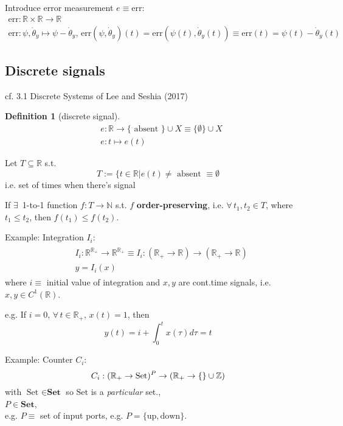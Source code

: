 \documentclass[10pt]{amsart}
\newtheorem{definition}{Definition}
\begin{document}
\begin{multicols*}{2}
Introduce error measurement $e\equiv \text{err}$:
\[
\begin{gathered}
	\text{err}:\mathbb{R} \times \mathbb{R} \to \mathbb{R} \\ 
\text{err}:\psi,\dot{\theta}_y \mapsto \psi- \dot{\theta}_y, \, \text{err}(\psi,\dot{\theta}_y)(t) = \text{err}(\psi(t),\dot{\theta}_y(t)) \equiv \text{err}(t) = \psi(t) - \dot{\theta}_y(t)
\end{gathered}
\]

\subsection{Discrete signals}

cf. 3.1 Discrete Systems of Lee and Seshia (2017) \cite{LeSe2017}

\begin{definition}[discrete signal]
\begin{equation}
\begin{aligned}
& e:\mathbb{R} \to \lbrace \text{ absent } \rbrace \cup X \equiv \lbrace \emptyset \rbrace \cup X \\ 
& e:t\mapsto e(t)
\end{aligned}
\end{equation}
\end{definition}

Let $T\subseteq \mathbb{R}$ s.t. 
\[
T:= \lbrace t\in \mathbb{R} | e(t) \neq \text{ absent } \equiv \emptyset 
\]
i.e. set of times when there's signal  

If $\exists \, $ 1-to-1 function $f:T\to \mathbb{N}$ s.t. $f$ \textbf{order-preserving}, i.e. $\forall \, t_1, t_2 \in T$, where $t_1\leq t_2$, then $f(t_1) \leq f(t_2)$.  

Example: Integration $I_i$: 
\[
\begin{gathered}
	\begin{aligned}
	& I_i: \mathbb{R}^{\mathbb{R}_+} \to \mathbb{R}^{\mathbb{R}_+} \equiv I_i : (\mathbb{R}_+ \to \mathbb{R}) \to (\mathbb{R}_+ \to \mathbb{R}) \\ 
	& y= I_i(x)
\end{aligned}
\end{gathered}
\]
where $i\equiv $ initial value of integration and $x,y$ are cont.time signals, i.e. $x,y \in C^1(\mathbb{R})$.  

e.g. If $i=0$, $\forall \, t \in \mathbb{R}_+$, $x(t) = 1$, then 
\[
y(t) = i+ \int_0^t x(\tau) d\tau = t
\]

Example: Counter $C_i$: 
\[
C_i: (\mathbb{R}_+ \to \text{Set})^P \to (\mathbb{R}_+ \to \lbrace \empty \rbrace \cup \mathbb{Z} )
\]
with $\text{Set } \in \textbf{Set}$ so $\text{Set}$ is a \emph{particular} set., \\
$P\in \textbf{Set}$, \\
e.g. $P\equiv $ set of input ports, e.g. $P=\lbrace \text{up}, \text{down} \rbrace$.  


\end{multicols*}
\end{document}

